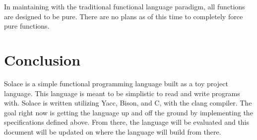 \documentclass{article}
\begin{document}
In maintaining with the traditional functional language paradigm, all functions are
designed to be pure. There are no plans as of this time to completely force pure functions.

\section{Conclusion}
Solace is a simple functional programming language built as a toy project language.
This language is meant to be simplistic to read and write programs with. Solace is written 
utilizing Yacc, Bison, and C, with the clang compiler.
The goal right now is getting the language up and off the ground by implementing the
specifications defined above. From there, the language will be evaluated and this document
will be updated on where the language will build from there.
\end{document}
